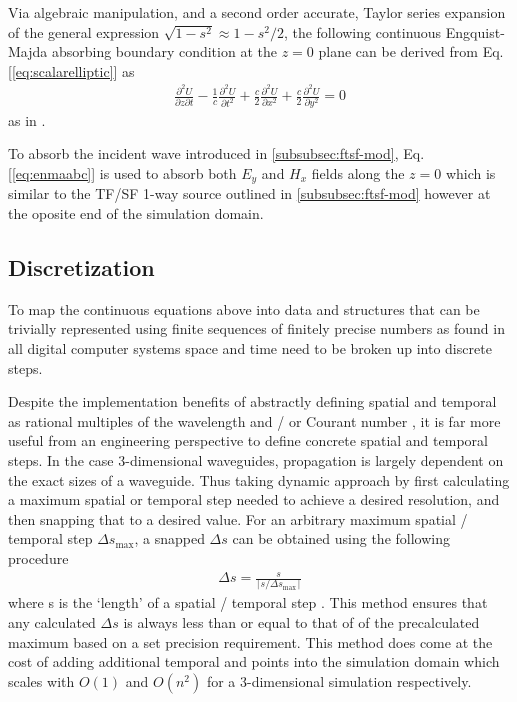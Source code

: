 Via algebraic manipulation, and a second order accurate, Taylor series expansion of the general expression $\sqrt{1-s^2}\approx1-s^2/2$, the following continuous Engquist-Majda absorbing boundary condition at the $z=0$ plane can be derived from Eq. [\ref{eq:scalarelliptic}] as
\begin{align}
	\frac{\partial^2 U}{\partial z\partial t}-\frac{1}{c}\frac{\partial^2 U}{\partial t^2}+\frac{c}{2}\frac{\partial^2 U}{\partial x^2}+\frac{c}{2}\frac{\partial^2 U}{\partial y^2}=0
	\label{eq:enmaabc}
\end{align}
as in \cite{taftlovefdtd}.

To absorb the incident wave introduced in \ref{subsubsec:ftsf-mod}, Eq. [\ref{eq:enmaabc}] is used to absorb both $E_y$ and $H_x$ fields along the $z=0$ which is similar to the TF/SF 1-way source outlined in \ref{subsubsec:ftsf-mod} however at the oposite end of the simulation domain.


\subsection{Discretization}
\label{subsec:discretization}
To map the continuous equations above into data and structures that can be trivially represented using finite sequences of finitely precise numbers as found in all digital computer systems space and time need to be broken up into discrete steps.

Despite the implementation benefits of abstractly defining spatial and temporal as rational multiples of the wavelength and / or Courant number \cite{ufdtd}, it is far more useful from an engineering perspective to define concrete spatial and temporal steps. In the case 3-dimensional waveguides, propagation is largely dependent on the exact sizes of a waveguide. Thus taking dynamic approach by first calculating a maximum spatial or temporal step needed to achieve a desired resolution, and then snapping that to a desired value. For an arbitrary maximum spatial / temporal step $\Delta s_{\max}$, a snapped $\Delta s$ can be obtained using the following procedure
\begin{align}
	\Delta s = \frac{s}{\lceil s / \Delta s_{\max}\rceil}
	\label{eq:snapping}
\end{align}
where s is the `length' of a spatial / temporal step \cite{empossible}. This method ensures that any calculated $\Delta s$ is always less than or equal to that of of the precalculated maximum based on a set precision requirement. This method does come at the cost of adding additional temporal and points into the simulation domain which scales with $O(1)$ and $O(n^2)$ for a 3-dimensional simulation respectively.

